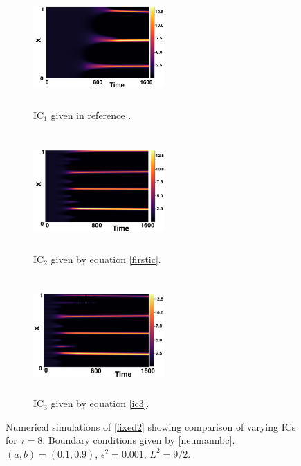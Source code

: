 \begin{figure}[H]
    \centering
    \begin{subfigure}[t]{0.32\textwidth}
        \centering
        \includegraphics[width=5cm,height=4.5cm]{gaff8.png}
        \caption{$\text{IC}_1$ given in reference \cite{gaffmonk}.}
        \label{}
    \end{subfigure}
    \hfill
    \begin{subfigure}[t]{0.32\textwidth}
        \centering
        \includegraphics[width=5cm,height=4.5cm]{ic28.png}
        \caption{$\text{IC}_2$ given by equation \eqref{firstic}.}
        \label{}
    \end{subfigure}
    \hfill
    \begin{subfigure}[t]{0.32\textwidth}
        \centering
        \includegraphics[width=5cm,height=4.5cm]{ic38.png}
        \caption{$\text{IC}_3$ given by equation \eqref{ic3}.}
        \label{}
    \end{subfigure}
    \caption{Numerical simulations of \eqref{fixed2} showing comparison of varying ICs for $\tau=8$. Boundary conditions given by \eqref{neumannbc}. $(a,b)=(0.1,0.9)$, $\epsilon^2=0.001$, $L^2=9/2$.}
    \label{fig:figtau8}
\end{figure}
